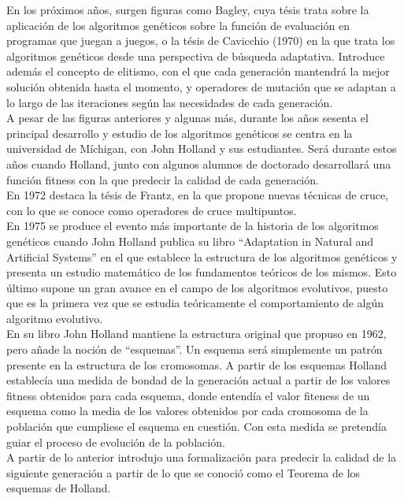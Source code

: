 \documentclass[12pt]{article} \usepackage[utf8x]{inputenc}
\begin{document}
En los próximos años, surgen figuras como Bagley, cuya tésis trata
sobre la aplicación de los algoritmos genéticos sobre la función de
evaluación en programas que juegan a juegos, o la tésis de Cavicchio
(1970) en la que trata los algoritmos genéticos desde una perspectiva
de búsqueda adaptativa.  Introduce además el concepto de elitismo, con
el que cada generación mantendrá la mejor solución obtenida hasta el
momento, y operadores de mutación que se
adaptan a lo largo de las iteraciones según las necesidades de cada generación.\\

A pesar de las figuras anteriores y algunas más, durante los años
sesenta el principal desarrollo y estudio de los algoritmos genéticos
se centra en la universidad de Míchigan, con John Holland y sus
estudiantes. Será durante estos años cuando Holland, junto con algunos
alumnos de doctorado desarrollará una
función fitness con la que predecir la calidad de cada generación.\\

En 1972 destaca la tésis de Frantz, en la que propone nuevas técnicas
de cruce,
con lo que se conoce como operadores de cruce multipuntos.\\



En 1975 se produce el evento más importante de la historia de los
algoritmos genéticos cuando John Holland publica su libro ``Adaptation
in Natural and Artificial Systems'' en el que establece la estructura
de los algoritmos genéticos y presenta un estudio matemático de los
fundamentos teóricos de los mismos. Esto último supone un gran avance
en el campo de los algoritmos evolutivos, puesto que es la primera vez
que se estudia teóricamente el
comportamiento de algún algoritmo evolutivo.\\


En su libro John Holland mantiene la estructura original que propuso
en 1962, pero añade la noción de ``esquemas''. Un esquema será
simplemente un patrón presente en la estructura de los cromosomas. A
partir de los esquemas Holland establecía una medida de bondad de la
generación actual a partir de los valores fitness obtenidos para cada
esquema, donde entendía el valor fiteness de un esquema como la media
de los valores obtenidos por cada cromosoma de la población que
cumpliese el esquema en cuestión. Con esta medida se pretendía guiar
el proceso
de evolución de la población. \\

A partir de lo anterior introdujo una formalización para predecir la
calidad de la siguiente generación a partir de lo que se conoció como
el Teorema de los
esquemas de Holland.\\
\end{document}
